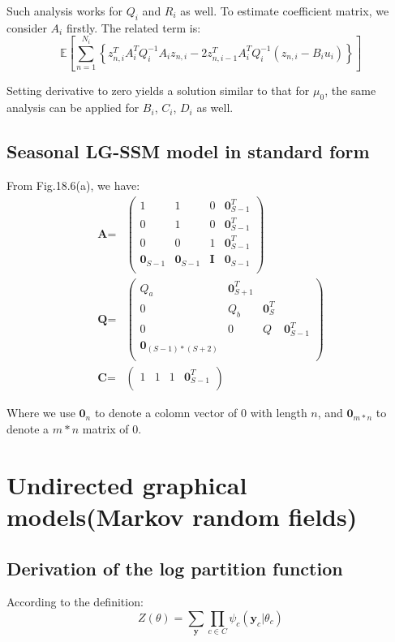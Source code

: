 \documentclass[UTF8]{ctexart}
\begin{document}
Such analysis works for $Q_{i}$ and $R_{i}$ as well. To estimate coefficient matrix, we consider $A_{i}$ firstly. The related term is:
$$\mathbb{E}[\sum_{n=1}^{N_{i}}\left\{z_{n,i}^{T}A_{i}^{T}Q_{i}^{-1}A_{i}z_{n,i}-2z_{n,i-1}^{T}A_{i}^{T}Q_{i}^{-1}(z_{n,i}-B_{i}u_{i})\right\}]$$

Setting derivative to zero yields a solution similar to that for $\mu_{0}$, the same analysis can be applied for $B_{i}$, $C_{i}$, $D_{i}$ as well.

\subsection{Seasonal LG-SSM model in standard form}
From Fig.18.6(a), we have:
\begin{align}
\textbf{A}=&\begin{pmatrix}
1 & 1 & 0 & \textbf{0}_{S-1}^{T} \\
0 & 1 & 0 & \textbf{0}_{S-1}^{T} \\
0 & 0 & 1 & \textbf{0}_{S-1}^{T} \\
\textbf{0}_{S-1} & \textbf{0}_{S-1} & \textbf{I} &  \textbf{0}_{S-1}\\
\end{pmatrix}\nonumber \\
\textbf{Q}=&\begin{pmatrix}
Q_{a} & \textbf{0}_{S+1}^{T} \\
0 & Q_{b} & \textbf{0}_{S}^{T} \\
0 & 0 & Q & \textbf{0}_{S-1}^{T} \\
\textbf{0}_{(S-1)*(S+2)} \\
\end{pmatrix}\nonumber \\
\textbf{C}=&\begin{pmatrix}1 & 1 & 1 & \textbf{0}_{S-1}^{T} \\ \end{pmatrix} \nonumber
\end{align}

Where we use $\textbf{0}_{n}$ to denote a colomn vector of $0$ with length $n$, and $\textbf{0}_{m*n}$ to denote a $m*n$ matrix of $0$.

\newpage
\section{Undirected graphical models(Markov random fields)}
\subsection{Derivation of the log partition function}
According to the definition:
$$Z(\theta)=\sum_{\textbf{y}}\prod_{c \in C}\psi_{c}(\textbf{y}_{c}|\theta_{c})$$
\end{document}
